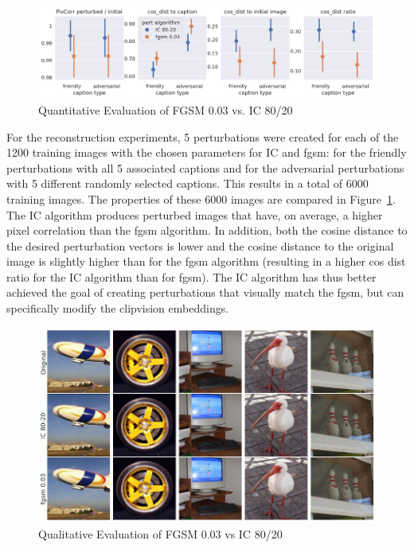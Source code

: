 
\begin{figure}[ht]
    \centering
    \includegraphics[width=1\textwidth]{plots/advpert_validation_chosen_perts.png}
    \caption{Quantitative Evaluation of FGSM 0.03 vs. IC 80/20}\label{fig:advpert_validation_chosen_perts} %
\end{figure}
    
For the reconstruction experiments, 5 perturbations were created for each of the 1200 training images with the chosen parameters for IC and fgsm: for the friendly perturbations with all 5 associated captions and for the adversarial perturbations with 5 different randomly selected captions. This results in a total of 6000 training images. The properties of these 6000 images are compared in Figure~\ref{fig:advpert_validation_chosen_perts}. The IC algorithm produces perturbed images that have, on average, a higher pixel correlation than the fgsm algorithm. In addition, both the cosine distance to the desired perturbation vectors is lower and the cosine distance to the original image is slightly higher than for the fgsm algorithm (resulting in a higher cos dist ratio for the IC algorithm than for fgsm). The IC algorithm has thus better achieved the goal of creating perturbations that visually match the fgsm, but can specifically modify the clipvision embeddings.

\begin{figure}[ht]
    \centering
    \includegraphics[width=1\textwidth]{plots/advpert_validation_chosen_qual.png}
    \caption{Qualitative Evaluation of FGSM 0.03 vs IC 80/20}\label{fig:advpert_validation_chosen_qual}
\end{figure}

